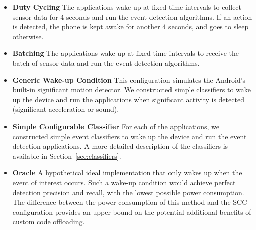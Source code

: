 \begin{itemize}

\item {\bf Duty Cycling} The applications wake-up at fixed time 
intervals to collect sensor data for 4 seconds and run the event 
detection algorithms.  If an action is detected, the phone is 
kept awake for another 4 seconds, and goes to sleep otherwise. 

\iffalse
\textbf{Duty Cycling} We modified the applications so that they check
sensor readings periodically and then put the phone to sleep.  On
wake-up, the phone is kept awake for 4 seconds in order to collect
sensor data.  If an action is detected, the phone is kept awake for
another 4 second, and goes to sleep otherwise.  This software only
implementation runs on any mobile device and does not require special
hardware support.
\fi

\item {\bf Batching} The applications wake-up at fixed time intervals to receive the batch of sensor data and run the event detection algorithms.

\iffalse
\textbf{Batching} This configuration emulates hardware support
available on the Nexus 5 for collecting and batching accelerometer
readings while the main processor sleeps.  The application wakes up
periodically, reads the batch of sensor readings, runs the detection
algorithm, and goes back to sleep.
\fi

\item {\bf Generic Wake-up Condition} This configuration simulates the Android's built-in significant motion detector.
We constructed simple classifiers to wake up the device and run the applications when significant activity is detected (significant acceleration or sound).

\item {\bf Simple Configurable Classifier} For each of the 
applications, we constructed simple event classifiers to 
wake up the device and run the event detection 
applications.  A more detailed description of the 
classifiers is available in Section~\ref{sec:classifiers}.

\item {\bf Oracle} A hypothetical ideal implementation that only wakes up
when the event of interest occurs.  Such a wake-up condition would
achieve perfect detection precision and recall, with
the lowest possible power consumption. The difference between the
power consumption of this method and the SCC configuration
provides an upper bound on the potential additional benefits of custom
code offloading.
  
\end{itemize}


